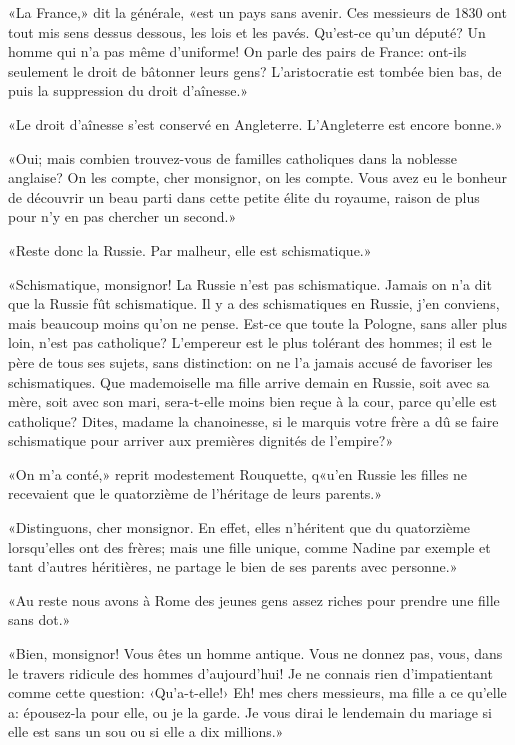 «La France,» dit la générale, «est un pays sans avenir. Ces messieurs de
1830 ont tout mis sens dessus dessous, les lois et les pavés. Qu'est-ce
qu'un député? Un homme qui n'a pas même d'uniforme! On parle des pairs
de France: ont-ils seulement le droit de bâtonner leurs gens?
L'aristocratie est tombée bien bas, de puis la suppression du droit
d'aînesse.»

«Le droit d'aînesse s'est conservé en Angleterre. L'Angleterre est
encore bonne.»

«Oui; mais combien trouvez-vous de familles catholiques dans la noblesse
anglaise? On les compte, cher monsignor, on les compte. Vous avez eu le
bonheur de découvrir un beau parti dans cette petite élite du royaume,
raison de plus pour n'y en pas chercher un second.»

«Reste donc la Russie. Par malheur, elle est schismatique.»

«Schismatique, monsignor! La Russie n'est pas schismatique. Jamais on
n'a dit que la Russie fût schismatique. Il y a des schismatiques en
Russie, j'en conviens, mais beaucoup moins qu'on ne pense. Est-ce que
toute la Pologne, sans aller plus loin, n'est pas catholique? L'empereur
est le plus tolérant des hommes; il est le père de tous ses sujets, sans
distinction: on ne l'a jamais accusé de favoriser les schismatiques. Que
mademoiselle ma fille arrive demain en Russie, soit avec sa mère, soit
avec son mari, sera-t-elle moins bien reçue à la cour, parce qu'elle est
catholique? Dites, madame la chanoinesse, si le marquis votre frère a dû
se faire schismatique pour arriver aux premières dignités de l'empire?»

«On m'a conté,» reprit modestement Rouquette, q«u'en Russie les filles
ne recevaient que le quatorzième de l'héritage de leurs parents.»

«Distinguons, cher monsignor. En effet, elles n'héritent que du
quatorzième lorsqu'elles ont des frères; mais une fille unique, comme
Nadine par exemple et tant d'autres héritières, ne partage le bien de
ses parents avec personne.»

«Au reste nous avons à Rome des jeunes gens assez riches pour prendre
une fille sans dot.»

«Bien, monsignor! Vous êtes un homme antique. Vous ne donnez pas, vous,
dans le travers ridicule des hommes d'aujourd'hui! Je ne connais rien
d'impatientant comme cette question: ‹Qu'a-t-elle!› Eh! mes chers
messieurs, ma fille a ce qu'elle a: épousez-la pour elle, ou je la
garde. Je vous dirai le lendemain du mariage si elle est sans un sou ou
si elle a dix millions.»

